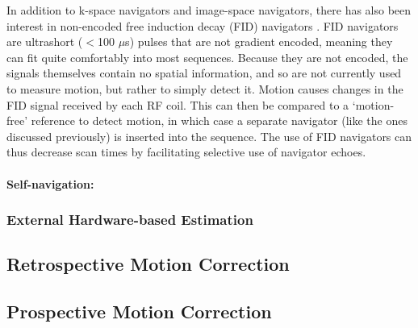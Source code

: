 \documentclass[class=article, crop=false]{standalone}
\begin{document}
\par 
In addition to k-space navigators and image-space navigators, there has also been interest in non-encoded free induction decay (FID) navigators \parencite{Waszak2016,MRM:MRM22797}. FID navigators are ultrashort ($<$100 $\mu$s) pulses that are not gradient encoded, meaning they can fit quite comfortably into most sequences. Because they are not encoded, the signals themselves contain no spatial information, and so are not currently used to measure motion, but rather to simply detect it. Motion causes changes in the FID signal received by each RF coil. This can then be compared to a `motion-free' reference to detect motion, in which case a separate navigator (like the ones discussed previously) is inserted into the sequence. The use of FID navigators can thus decrease scan times by facilitating selective use of navigator echoes. 


\paragraph{Self-navigation:}

\subsubsection{External Hardware-based Estimation}

\subsection{Retrospective Motion Correction}

\subsection{Prospective Motion Correction}
\end{document}
